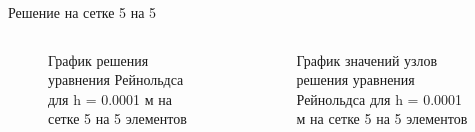 \documentclass[ignoreonframetext,unicode]{beamer}
\begin{document}
\begin{frame}{Решение на сетке 5 на 5}

\begin{columns}
	
\begin{figure}[!htbp]
	\caption{График решения уравнения Рейнольдса для h = 0.0001 м на сетке 5 на 5 элементов}
	\label{5x5mesh}
\end{figure}

\begin{figure}[!htbp]
	\caption{График значений узлов решения уравнения Рейнольдса для h = 0.0001 м на сетке 5 на 5 элементов}
	\label{5x5points}
\end{figure}

\end{columns}
	
\end{frame}
\end{document}
